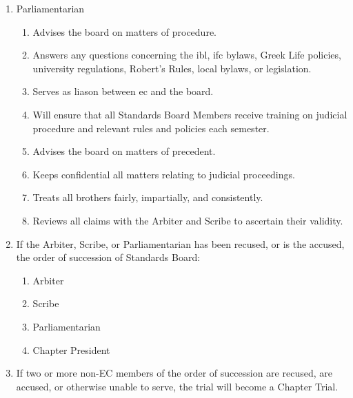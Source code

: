 \begin{enumerate}
		\item Parliamentarian
			\begin{enumerate}
				\item Advises the board on matters of procedure.
				\item Answers any questions concerning the \gls{ibl}, \gls{ifc} bylaws, Greek Life policies, university regulations, Robert's Rules, local bylaws, or legislation.
				\item Serves as liason between \gls{ec} and the board.
				\item Will ensure that all Standards Board Members receive training on judicial procedure and relevant rules and policies each semester.
				\item Advises the board on matters of precedent.
				\item Keeps confidential all matters relating to judicial proceedings.
				\item Treats all brothers fairly, impartially, and consistently.
				\item Reviews all claims with the Arbiter and Scribe to ascertain their validity.
			\end{enumerate}

		\item If the Arbiter, Scribe, or Parliamentarian has been recused, or is the accused, the order of succession of Standards Board:
		\label{stds-board-succession}
			\begin{enumerate}
				\item Arbiter
				\item Scribe
				\item Parliamentarian
				\item Chapter President
			\end{enumerate}

		\item If two or more non-EC members of the order of succession are recused, are accused, or otherwise unable to serve, the trial will become a Chapter Trial.

	\end{enumerate}

